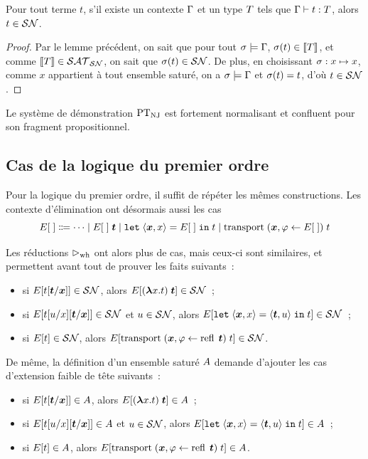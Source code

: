 \begin{theorem}
  Pour tout terme $t$, s'il existe un contexte $\Gamma$ et un type $T$
  tels que $\Gamma\mathrel{\vdash} t : T$, alors $t \in \mathcal{SN}$.
\end{theorem}

\begin{proof}
  Par le lemme précédent, on sait que pour tout $\sigma\models\Gamma$,
  $\sigma(t) \in \llbracket T\rrbracket$, et comme $\llbracket T\rrbracket\in\mathcal{SAT}_{\mathcal{SN}}$, on
  sait que $\sigma(t) \in \mathcal{SN}$. De plus, en choisissant
  $\sigma : x \mapsto x$, comme $x$ appartient à tout ensemble saturé, on a
  $\sigma\models \Gamma$ et $\sigma(t) = t$, d'où $t\in \mathcal{SN}$.
\end{proof}

\begin{corollary}
  Le système de démonstration $\operatorname{PT}_{\operatorname{NJ}}$ est fortement normalisant et confluent
  pour son fragment propositionnel.
\end{corollary}

\subsection{Cas de la logique du premier ordre}

Pour la logique du premier ordre, il suffit de répéter les mêmes constructions.
Les contexte d'élimination ont désormais aussi les cas
\[E[\;]\inddefeq \cdots\mid E[\;]\;\btermt\mid \letin\bvarx x {E[\;]} t\mid
\transp\;(\bvarx,\varFF\leftarrow E[\;])\;t\]

Les réductions $\mathrel{\rhd_{\mathrm{wh}}}$ ont alors plus de cas, mais ceux-ci sont similaires,
et permettent avant tout de prouver les faits suivants~:
\begin{itemize}
\item si $E[t[\bm{t}/\bm{x}]] \in \mathcal{SN}$, alors
  $E[(\bm{\lambda} x. t)\;\bm{t}]\in\mathcal{SN}$~;
\item si $E[t[u/x][\bm{t}/\bm{x}]]\in \mathcal{SN}$ et $u \in \mathcal{SN}$, alors
  $E[{\normalfont\texttt{let}}\;\langle \bm{x},x\rangle = \langle \bm{t}, u\rangle\;{\normalfont\texttt{in}}\;t] \in \mathcal{SN}$~;
\item si $E[t] \in \mathcal{SN}$, alors
  $E[\operatorname{transport}\;(\bm{x}, \varphi \leftarrow \operatorname{refl}\;\bm{t})\;t]\in \mathcal{SN}$.
\end{itemize}

De même, la définition d'un ensemble saturé $A$ demande d'ajouter les cas
d'extension faible de tête suivants~:
\begin{itemize}
\item si $E[t[\bm{t}/\bm{x}]] \in A$, alors
  $E[(\bm{\lambda} x. t)\;\bm{t}]\in A$~;
\item si $E[t[u/x][\bm{t}/\bm{x}]]\in A$ et $u \in \mathcal{SN}$, alors
  $E[{\normalfont\texttt{let}}\;\langle \bm{x},x\rangle = \langle \bm{t}, u\rangle\;{\normalfont\texttt{in}}\;t] \in A$~;
\item si $E[t] \in A$, alors
  $E[\operatorname{transport}\;(\bm{x}, \varphi \leftarrow \operatorname{refl}\;\bm{t})\;t]\in A$.
\end{itemize}

